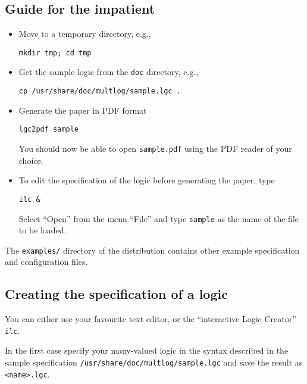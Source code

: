 \documentclass[
]{article}
\newcommand{\passthrough}[1]{#1}
\begin{document}
\hypertarget{guide-for-the-impatient}{%
\subsection{Guide for the impatient}\label{guide-for-the-impatient}}

\begin{itemize}
\item
  Move to a temporary directory, e.g.,

\begin{lstlisting}
mkdir tmp; cd tmp
\end{lstlisting}
\item
  Get the sample logic from the \passthrough{\lstinline!doc!} directory,
  e.g.,

\begin{lstlisting}
cp /usr/share/doc/multlog/sample.lgc .
\end{lstlisting}
\item
  Generate the paper in PDF format

\begin{lstlisting}
lgc2pdf sample
\end{lstlisting}

  You should now be able to open \passthrough{\lstinline!sample.pdf!}
  using the PDF reader of your choice.
\item
  To edit the specification of the logic before generating the paper,
  type

\begin{lstlisting}
ilc &
\end{lstlisting}

  Select ``Open'' from the menu ``File'' and type
  \passthrough{\lstinline!sample!} as the name of the file to be loaded.
\end{itemize}

The \passthrough{\lstinline!examples/!} directory of the distribution
contains other example specification and configuration files.

\hypertarget{creating-the-specification-of-a-logic}{%
\subsection{Creating the specification of a
logic}\label{creating-the-specification-of-a-logic}}

You can either use your favourite text editor, or the ``interactive
Logic Creator'' \passthrough{\lstinline!ilc!}.

In the first case specify your many-valued logic in the syntax described
in the sample specification
\passthrough{\lstinline!/usr/share/doc/multlog/sample.lgc!} and save the
result as \passthrough{\lstinline!<name>.lgc!}.
\end{document}
